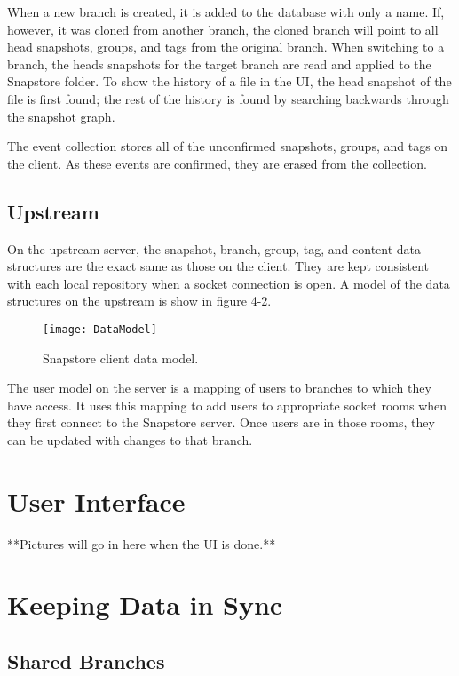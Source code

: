 When a new branch is created, it is added to the database with only a name. If, however, it was cloned from another branch, the cloned branch will point to all head snapshots, groups, and tags from the original branch. When switching to a branch, the heads snapshots for the target branch are read and applied to the Snapstore folder. To show the history of a file in the UI, the head snapshot of the file is first found; the rest of the history is found by searching backwards through the snapshot graph.

The event collection stores all of the unconfirmed snapshots, groups, and tags on the client. As these events are confirmed, they are erased from the collection.

\subsection{Upstream}

On the upstream server, the snapshot, branch, group, tag, and content data structures are the exact same as those on the client. They are kept consistent with each local repository when a socket connection is open. A model of the data structures on the upstream is show in figure 4-2.

\begin{figure}
\texttt{[image: DataModel]}
\caption{Snapstore client data model.}
\label{arm:fig1}
\end{figure}

The user model on the server is a mapping of users to branches to which they have access. It uses this mapping to add users to appropriate socket rooms when they first connect to the Snapstore server. Once users are in those rooms, they can be updated with changes to that branch.

\section{User Interface}

**Pictures will go in here when the UI is done.**

\section{Keeping Data in Sync}

\subsection{Shared Branches}

